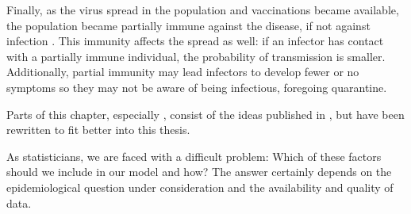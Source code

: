 Finally, as the virus spread in the population and vaccinations became available, the population became partially immune against the disease, if not against infection . This immunity affects the spread as well: if an infector has contact with a partially immune individual, the probability of transmission is smaller. Additionally, partial immunity may lead infectors to develop fewer or no symptoms so they may not be aware of being infectious, foregoing quarantine.

Parts of this chapter, especially , consist of the ideas published in \citep{Heyder2023Measures}, but have been rewritten to fit better into this thesis.

As statisticians, we are faced with a difficult problem: Which of these factors should we include in our model and how? The answer certainly depends on the epidemiological question under consideration and the availability and quality of data. 





